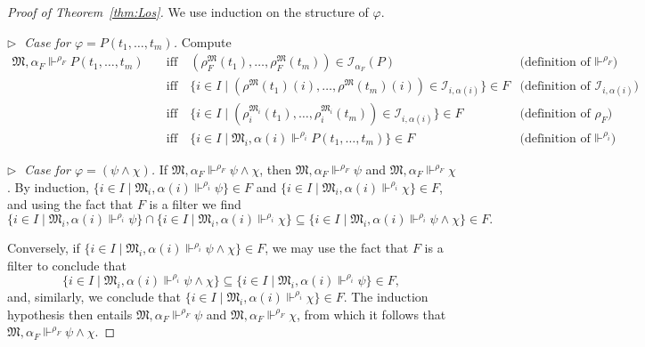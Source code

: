 \documentclass[submission,copyright,creativecommons]{eptcs}
\newcommand{\mo}{\mathfrak}
\renewcommand{\phi}{\varphi}
\renewcommand{\iff}{\quad\text{iff}\quad}
\newcommand{\II}{\mathscr{I}}
\newcommand{\satisfySym}{\Vdash}
\newcommand{\satisfy}[4]{#1, #2 \satisfySym^{#4} #3}
\begin{document}
\begin{proof}[Proof of Theorem~\ref{thm:Los}]
  We use induction on the structure of $\phi$.

  \medskip\noindent
  \textit{$\triangleright\;$ Case for $\phi = P(t_1, \ldots, t_m)$.}
    Compute
    \begin{align*}
      \satisfy{\mo{M}}{\alpha_F}{P(t_1, \ldots, t_m)}{\rho_F}
        &\iff (\rho^{\mo{M}}_F(t_1), \ldots, \rho^{\mo{M}}_F(t_m)) \in \II_{\alpha_F}(P)
        &\text{(definition of $\satisfySym^{\rho_F}$)} \\
        &\iff \{ i \in I \mid (\rho^{\mo{M}}(t_1)(i), \ldots, \rho^{\mo{M}}(t_m)(i)) \in \II_{i, \alpha(i)} \} \in F 
        &\text{(definition of $\II_{i, \alpha(i)}$)} \\
        &\iff \{ i \in I \mid (\rho^{\mo{M}_i}_i(t_1), \ldots, \rho^{\mo{M}_i}_i(t_m)) \in \II_{i, \alpha(i)} \} \in F
        &\text{(definition of $\rho_F$)} \\
        &\iff \{ i \in I \mid \satisfy{\mo{M}_i}{\alpha(i)}{P(t_1, \ldots, t_m)}{\rho_i} \} \in F
        &\text{(definition of $\satisfySym^{\rho_i}$)}
    \end{align*}

  \medskip\noindent
  \textit{$\triangleright\;$ Case for $\phi = (\psi \wedge \chi)$.}
    If $\satisfy{\mo{M}}{\alpha_F}{\psi \wedge \chi}{\rho_F}$,
    then $\satisfy{\mo{M}}{\alpha_F}{\psi}{\rho_F}$ and
    $\satisfy{\mo{M}}{\alpha_F}{\chi}{\rho_F}$.
    By induction, $\{ i \in I \mid \satisfy{\mo{M}_i}{\alpha(i)}{\psi}{\rho_i} \} \in F$
    and $\{ i \in I \mid \satisfy{\mo{M}_i}{\alpha(i)}{\chi}{\rho_i} \} \in F$,
    and using the fact that $F$ is a filter we find
    \begin{equation*}
      \{ i \in I \mid \satisfy{\mo{M}_i}{\alpha(i)}{\psi}{\rho_i} \}
        \cap \{ i \in I \mid \satisfy{\mo{M}_i}{\alpha(i)}{\chi}{\rho_i} \}
        \subseteq \{ i \in I \mid \satisfy{\mo{M}_i}{\alpha(i)}{\psi \wedge \chi}{\rho_i} \} \in F.
    \end{equation*}
    
    Conversely, if $\{ i \in I \mid \satisfy{\mo{M}_i}{\alpha(i)}{\psi \wedge \chi}{\rho_i} \}\in F$,
    we may use the fact that $F$ is a filter to conclude that
    \begin{equation*}
      \{ i \in I \mid \satisfy{\mo{M}_i}{\alpha(i)}{\psi \wedge \chi}{\rho_i} \}
        \subseteq \{ i \in I \mid \satisfy{\mo{M}_i}{\alpha(i)}{\psi}{\rho_i} \} \in F,
    \end{equation*}
    and, similarly, we conclude that $\{ i \in I \mid \satisfy{\mo{M}_i}{\alpha(i)}{\chi}{\rho_i} \} \in F$.
    The induction hypothesis then entails $\satisfy{\mo{M}}{\alpha_F}{\psi}{\rho_F}$ and
    $\satisfy{\mo{M}}{\alpha_F}{\chi}{\rho_F}$, from which it follows that
    $\satisfy{\mo{M}}{\alpha_F}{\psi \wedge \chi}{\rho_F}$.


\end{proof}
\end{document}
